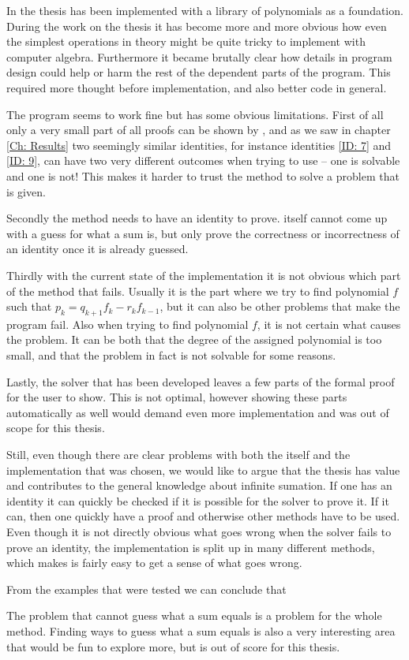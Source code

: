 In the thesis \WZ has been implemented with a library of polynomials as a foundation. During the work on the thesis it has become more and more obvious how even the simplest operations in theory might be quite tricky to implement with computer algebra. Furthermore it became brutally clear how details in program design could help or harm the rest of the dependent parts of the program. This required more thought before implementation, and also better code in general.

The program seems to work fine but has some obvious limitations. First of all only a very small part of all proofs can be shown by \WZ, and as we saw in chapter \ref{Ch: Results} two seemingly similar identities, for instance identities \ref{ID: 7} and \ref{ID: 9}, can have two very different outcomes when trying to use \WZ -- one is solvable and one is not! This makes it harder to trust the method to solve a problem that is given.

Secondly the method needs to have an identity to prove. \WZ itself cannot come up with a guess for what a sum is, but only prove the correctness or incorrectness of an identity once it is already guessed.

Thirdly with the current state of the implementation it is not obvious which part of the method that fails. Usually it is the part where we try to find polynomial $f$ such that $p_k=q_{k+1}f_k-r_kf_{k-1}$, but it can also be other problems that make the program fail. Also when trying to find polynomial $f$, it is not certain what causes the problem. It can be both that the degree of the assigned polynomial is too small, and that the problem in fact is not solvable for some reasons.

Lastly, the \WZ solver that has been developed leaves a few parts of the formal proof for the user to show. This is not optimal, however showing these parts automatically as well would demand even more implementation and was out of scope for this thesis.

Still, even though there are clear problems with both the \WZ itself and the implementation that was chosen, we would like to argue that the thesis has value and contributes to the general knowledge about infinite sumation. If one has an identity it can quickly be checked if it is possible for the \WZ solver to prove it. If it can, then one quickly have a proof and otherwise other methods have to be used. Even though it is not directly obvious what goes wrong when the solver fails to prove an identity, the implementation is split up in many different methods, which makes is fairly easy to get a sense of what goes wrong.

From the examples that were tested we can conclude that 

The problem that \WZ cannot guess what a sum equals is a problem for the whole method. Finding ways to guess what a sum equals is also a very interesting area that would be fun to explore more, but is out of score for this thesis.
